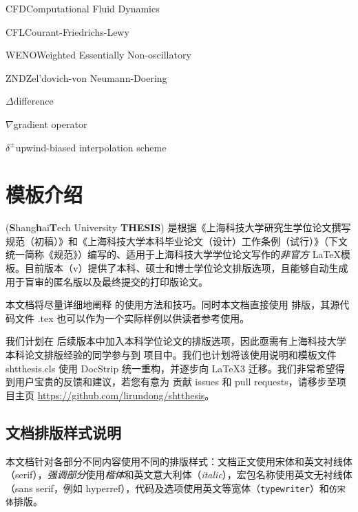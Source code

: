 \documentclass[master]{shtthesis}
\begin{document}
\begin{nomenclatures}[缩写]
  \item{CFD}{Computational Fluid Dynamics}
  \item{CFL}{Courant-Friedrichs-Lewy}
  \item{WENO}{Weighted Essentially Non-oscillatory}
  \item{ZND}{Zel'dovich-von Neumann-Doering}
\end{nomenclatures}

\begin{nomenclatures}[算子 \& 说明]
  \item{$\Delta$}{difference}
  \item{$\nabla$}{gradient operator}
  \item{$\delta^{\pm}$}{upwind-biased interpolation scheme}
\end{nomenclatures}
\fi

\mainmatter
\chapter{模板介绍}
\shtthesis{} (\textbf{S}hang\textbf{h}ai\textbf{T}ech University \textbf{THESIS}) 是根据《上海科技大学研究生学位论文撰写规范（初稿）》和《上海科技大学本科毕业论文（设计）工作条例（试行）》（下文统一简称《规范》）编写的、适用于上海科技大学学位论文写作的\emph{非官方} \LaTeX 模板。目前版本（v\version{}）提供了本科、硕士和博士学位论文排版选项，且能够自动生成用于盲审的匿名版以及最终提交的打印版论文。

本文档将尽量详细地阐释 \shtthesis{} 的使用方法和技巧。同时本文档直接使用 \shtthesis{} 排版，其源代码文件 \jobname.tex 也可以作为一个实际样例以供读者参考使用。

我们计划在 \shtthesis{} 后续版本中加入本科学位论文的排版选项，因此亟需有上海科技大学本科论文排版经验的同学参与到 \shtthesis{} 项目中。我们也计划将该使用说明和模板文件 shtthesis.cls 使用 \textsf{DocStrip} 统一重构，并逐步向 \LaTeX3 迁移。我们非常希望得到用户宝贵的反馈和建议，若您有意为 \shtthesis{} 贡献 issues 和 pull requests，请移步至项目主页 \url{https://github.com/lirundong/shtthesis}。

\section*{文档排版样式说明}
本文档针对各部分不同内容使用不同的排版样式：文档正文使用宋体和英文衬线体（serif），\emph{强调部分}使用\emph{楷体}和英文意大利体（\emph{italic}），宏包名称使用英文无衬线体（\textsf{sans serif}，例如 \textsf{hyperref}），代码及选项使用英文等宽体（\texttt{typewriter}）和\texttt{仿宋体}排版。
\end{document}
